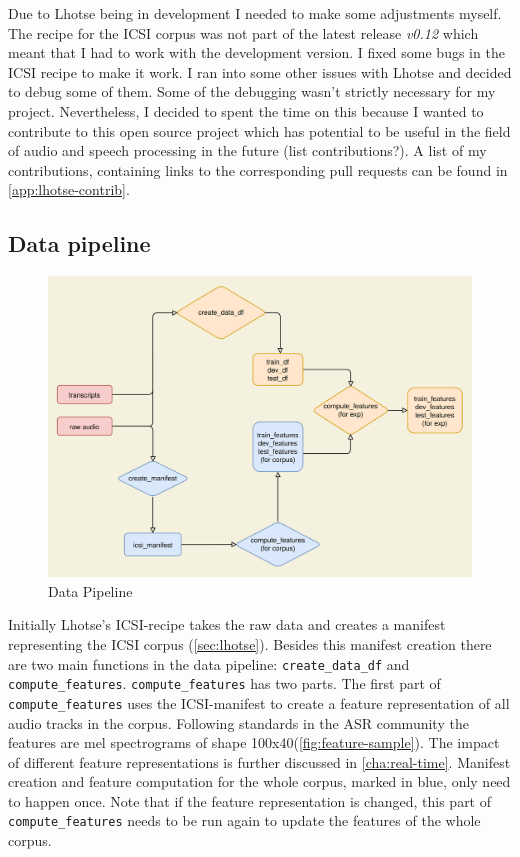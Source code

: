 \documentclass[bsc,frontabs,parskip,deptreport]{infthesis}
\begin{document}
Due to Lhotse being in development I needed to make some adjustments myself. The recipe for the ICSI corpus was not part of the latest release \textit{v0.12} which meant that I had to work with the development version. 
I fixed some bugs in the ICSI recipe to make it work. 
I ran into some other issues with Lhotse and decided to debug some of them. Some of the debugging wasn't strictly necessary for my project. 
Nevertheless, I decided to spent the time on this because I wanted to contribute to this open source project which has potential to be useful in the field of audio and speech processing in the future (list contributions?). A list of my contributions, containing links to the corresponding pull requests can be found in \autoref{app:lhotse-contrib}.

\subsection{Data pipeline} \label{sec:ml-data-pipeline}

\begin{figure}
    \centering
    \includegraphics[width=15cm]{imgs/diagrams/Pipeline.drawio.png}
    \caption{Data Pipeline}
    \label{fig:data-pipeline}
\end{figure}

Initially Lhotse's ICSI-recipe takes the raw data and creates a manifest representing the ICSI corpus (\autoref{sec:lhotse}).
Besides this manifest creation there are two main functions in the data pipeline: \verb|create_data_df| and \verb|compute_features|. 
\verb|compute_features| has two parts.
The first part of \verb|compute_features| uses the ICSI-manifest to create a feature representation of all audio tracks in the corpus. Following standards in the ASR community the features are mel spectrograms of shape 100x40(\autoref{fig:feature-sample}). The impact of different feature representations is further discussed in \autoref{cha:real-time}. 
Manifest creation and feature computation for the whole corpus, marked in blue, only need to happen once.
Note that if the feature representation is changed, this part of \verb|compute_features| needs to be run again to update the features of the whole corpus.
\end{document}
